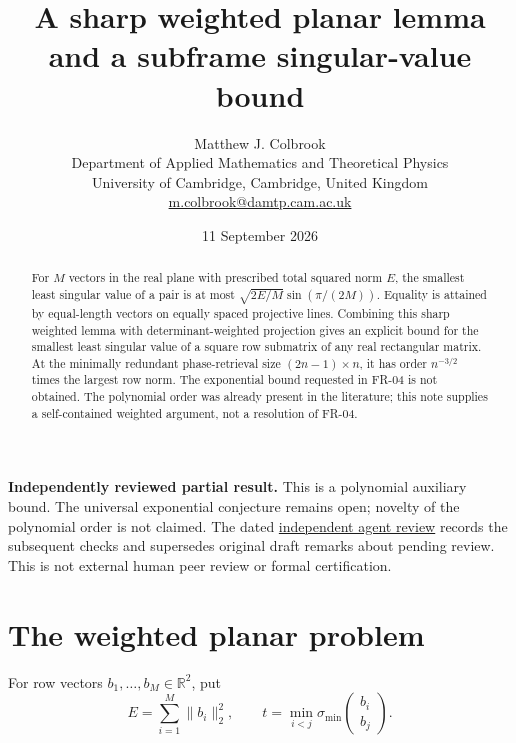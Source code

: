 \documentclass[11pt]{article}
\title{A sharp weighted planar lemma and a subframe singular-value bound}
\author{Matthew J. Colbrook\\\small Department of Applied Mathematics and Theoretical Physics\\\small University of Cambridge, Cambridge, United Kingdom\\\small\href{mailto:m.colbrook@damtp.cam.ac.uk}{m.colbrook@damtp.cam.ac.uk}}\date{11 September 2026}
\newcommand{\R}{\mathbb R}\newcommand{\sm}{\sigma_{\min}}
\begin{document}
\maketitle

\noindent\textbf{Independently reviewed partial result.} This is a polynomial auxiliary bound. The universal exponential conjecture remains open; novelty of the polynomial order is not claimed.
The dated \href{https://github.com/MColbrook/OpenProblemsInNLA/blob/codex/colbrook-frames-submissions/references/colbrook-frames-2026-09-11/verification/reviews/FR-04-review.md}{independent agent review} records the subsequent checks and supersedes original draft remarks about pending review. This is not external human peer review or formal certification.
\par\medskip

\begin{abstract}
For $M$ vectors in the real plane with prescribed total squared norm $E$, the smallest least singular value of a pair is at most $\sqrt{2E/M}\sin(\pi/(2M))$. Equality is attained by equal-length vectors on equally spaced projective lines. Combining this sharp weighted lemma with determinant-weighted projection gives an explicit bound for the smallest least singular value of a square row submatrix of any real rectangular matrix. At the minimally redundant phase-retrieval size $(2n-1)\times n$, it has order $n^{-3/2}$ times the largest row norm. The exponential bound requested in FR-04 is not obtained. The polynomial order was already present in the literature; this note supplies a self-contained weighted argument, not a resolution of FR-04.
\end{abstract}

\section{The weighted planar problem}
For row vectors $b_1,\ldots,b_M\in\R^2$, put
\[
 E=\sum_{i=1}^M\|b_i\|_2^2,\qquad
 t=\min_{i<j}\sm\begin{pmatrix}b_i\\b_j\end{pmatrix}.
\]
\end{document}
